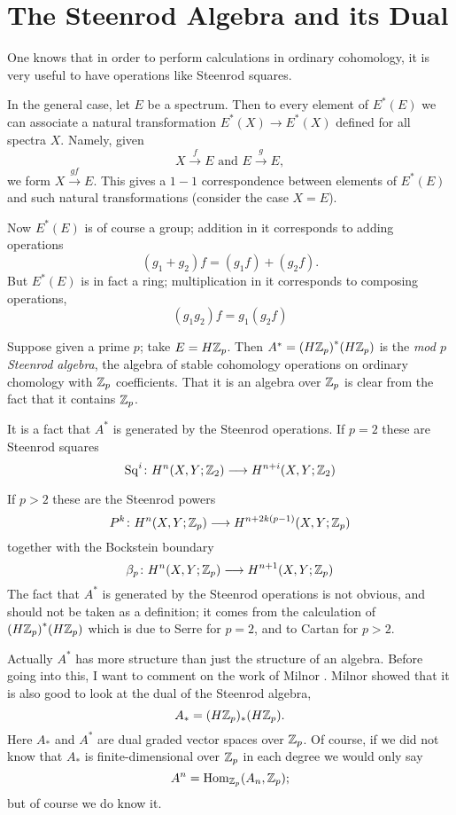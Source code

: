 \documentclass[../main]{subfiles}
\begin{document}
\chapter{The Steenrod Algebra and its Dual}
\label{sec:p3c12}
One knows that in order to perform calculations in ordinary cohomology, it is very useful to have operations like Steenrod squares.

In the general case, let $E$ be a spectrum. Then to every element of $E^\ast(E)$ we can associate a natural transformation $E^\ast(X)\longrightarrow E^\ast(X)$ defined for all spectra $X$. Namely, given
\[ X\overset f\longrightarrow E \text{ and } E\overset g\longrightarrow E, \]
we form $X\overset{gf}\longrightarrow E$. This gives a $1-1$ correspondence between elements of $E^\ast(E)$ and such natural transformations (consider the case $X=E$).

Now $E^\ast(E)$ is of course a group; addition in it corresponds to adding operations
\[ (g_1+g_2)f = (g_1f) + (g_2f). \]
But $E^\ast(E)$ is in fact a ring; multiplication in it %
corresponds to composing operations,
\[ (g_1g_2)f = g_1(g_2f) \]

\begin{examples}

Suppose given a prime $p$; take $E=H\mathbb{Z}_p$. Then $A^\ast={(H\mathbb{Z}_p)}^\ast(H\mathbb{Z}_p)$ is the \emph{mod $p$ Steenrod algebra}, the algebra of stable cohomology operations on ordinary chomology with $\mathbb{Z}_p$ coefficients. That it is an algebra over $\mathbb{Z}_p$ is clear from the fact that it contains $\mathbb{Z}_p$.

\end{examples} %

It is a fact that $A^\ast$ is generated by the Steenrod operations. If $p=2$ these are Steenrod squares
\[ \mathrm{Sq}^i\colon H^n(X, Y; \mathbb{Z}_2) \longrightarrow H^{n+i}(X, Y; \mathbb{Z}_2) \]

If $p>2$ these are the Steenrod powers
\[ P^k\colon H^n(X, Y; \mathbb{Z}_p) \longrightarrow H^{n+2k(p-1)}(X, Y;\mathbb{Z}_p) \]
together with the Bockstein boundary
\[ \beta_p\colon H^n(X,Y;\mathbb{Z}_p)\longrightarrow H^{n+1}(X,Y;\mathbb{Z}_p) \]
The fact that $A^\ast$ is generated by the Steenrod operations is not obvious, and should not be taken as a definition; it comes from the calculation of ${(H\mathbb{Z}_p)}^\ast(H\mathbb{Z}_p)$ which is due to Serre for $p=2$, and to Cartan for $p>2$.

Actually $A^\ast$ has more structure than just the structure of an algebra. Before going into this, I want to comment on the work of Milnor \cite{milnor}. Milnor showed that it is also good to look at the dual of the Steenrod algebra,
\[ A_\ast=(H\mathbb{Z}_p)_\ast(H\mathbb{Z}_p). \]
Here $A_\ast$ and $A^\ast$ are dual graded vector spaces over $\mathbb{Z}_p$. Of course, if we did not know that $A_\ast$ is finite-dimensional over $\mathbb{Z}_p$ in each degree we would only say
\[ A^n=\mathrm{Hom}_{\mathbb{Z}_p}(A_n,\mathbb{Z}_p); \]
but of course we do know it.
\end{document}
